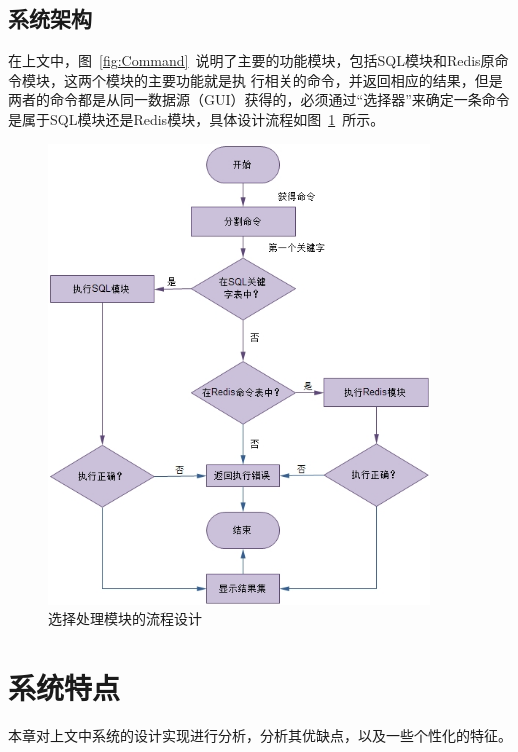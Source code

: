 \documentclass{zjutthesis}
\begin{document}
\section{系统架构}
在上文中，图~\ref{fig:Command}~说明了主要的功能模块，包括SQL模块和Redis原命令模块，这两个模块的主要功能就是执
行相关的命令，并返回相应的结果，但是两者的命令都是从同一数据源（GUI）获得的，必须通过“选择器”来确定一条命令是属于SQL模块还是Redis模块，具体设计流程如图~\ref{fig:Selector}~所示。
\begin{figure}[H]
\centering
\includegraphics[width=0.9\textwidth]{Selector}
\caption{选择处理模块的流程设计}\label{fig:Selector}
\vspace{\baselineskip} %
\end{figure}

\chapter{系统特点}
本章对上文中系统的设计实现进行分析，分析其优缺点，以及一些个性化的特征。
\end{document}
